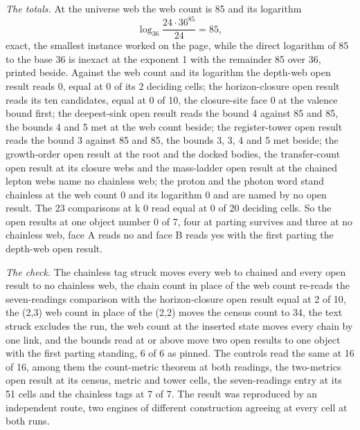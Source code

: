 \begin{chproof}
\textit{The totals.} At the universe web the web count is 85 and its logarithm
\begin{equation}
\log_{36}\frac{24\cdot 36^{85}}{24} = 85,
\end{equation}
exact, the smallest instance worked on the page, while the direct logarithm of 85 to the base 36 is inexact at the exponent 1 with the remainder 85 over 36, printed beside. Against the web count and its logarithm the depth-web open result reads 0, equal at 0 of its 2 deciding cells; the horizon-closure open result reads its ten candidates, equal at 0 of 10, the closure-site face 0 at the valence bound first; the deepest-sink open result reads the bound 4 against 85 and 85, the bounds 4 and 5 met at the web count beside; the register-tower open result reads the bound 3 against 85 and 85, the bounds 3, 3, 4 and 5 met beside; the growth-order open result at the root and the docked bodies, the transfer-count open result at its closure webs and the mass-ladder open result at the chained lepton webs name no chainless web; the proton and the photon word stand chainless at the web count 0 and its logarithm 0 and are named by no open result. The 23 comparisons at k 0 read equal at 0 of 20 deciding cells. So the open results at one object number 0 of 7, four at parting survives and three at no chainless web, face A reads no and face B reads yes with the first parting the depth-web open result.

\textit{The check.} The chainless tag struck moves every web to chained and every open result to no chainless web, the chain count in place of the web count re-reads the seven-readings comparison with the horizon-closure open result equal at 2 of 10, the (2,3) web count in place of the (2,2) moves the census count to 34, the text struck excludes the run, the web count at the inserted state moves every chain by one link, and the bounds read at or above move two open results to one object with the first parting standing, 6 of 6 as pinned. The controls read the same at 16 of 16, among them the count-metric theorem at both readings, the two-metrics open result at its census, metric and tower cells, the seven-readings entry at its 51 cells and the chainless tags at 7 of 7. The result was reproduced by an independent route, two engines of different construction agreeing at every cell at both runs.
\end{chproof}
